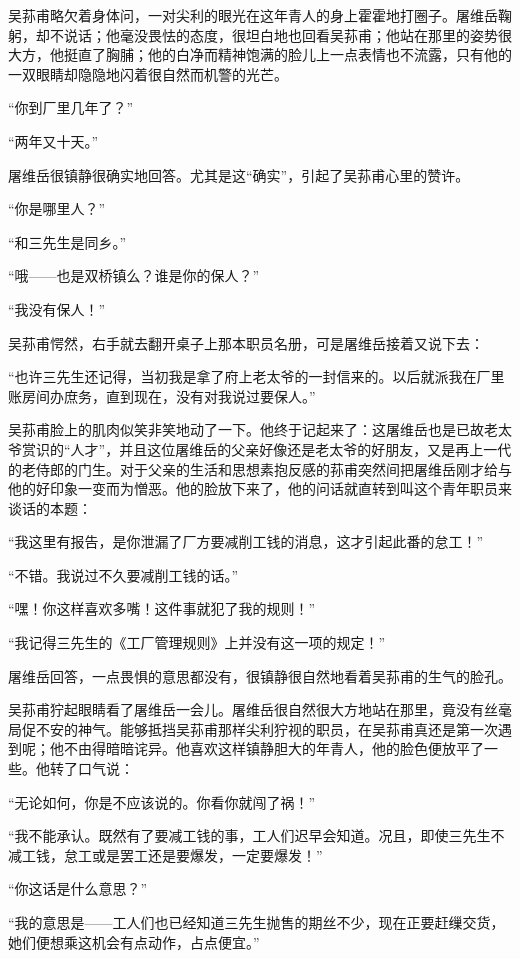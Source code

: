 \par 吴荪甫略欠着身体问，一对尖利的眼光在这年青人的身上霍霍地打圈子。屠维岳鞠躬，却不说话；他毫没畏怯的态度，很坦白地也回看吴荪甫；他站在那里的姿势很大方，他挺直了胸脯；他的白净而精神饱满的脸儿上一点表情也不流露，只有他的一双眼睛却隐隐地闪着很自然而机警的光芒。
\par “你到厂里几年了？”
\par “两年又十天。”
\par 屠维岳很镇静很确实地回答。尤其是这“确实”，引起了吴荪甫心里的赞许。
\par “你是哪里人？”
\par “和三先生是同乡。”
\par “哦——也是双桥镇么？谁是你的保人？”
\par “我没有保人！”
\par 吴荪甫愕然，右手就去翻开桌子上那本职员名册，可是屠维岳接着又说下去：
\par “也许三先生还记得，当初我是拿了府上老太爷的一封信来的。以后就派我在厂里账房间办庶务，直到现在，没有对我说过要保人。”
\par 吴荪甫脸上的肌肉似笑非笑地动了一下。他终于记起来了：这屠维岳也是已故老太爷赏识的“人才”，并且这位屠维岳的父亲好像还是老太爷的好朋友，又是再上一代的老侍郎的门生。对于父亲的生活和思想素抱反感的荪甫突然间把屠维岳刚才给与他的好印象一变而为憎恶。他的脸放下来了，他的问话就直转到叫这个青年职员来谈话的本题：
\par “我这里有报告，是你泄漏了厂方要减削工钱的消息，这才引起此番的怠工！”
\par “不错。我说过不久要减削工钱的话。”
\par “嘿！你这样喜欢多嘴！这件事就犯了我的规则！”
\par “我记得三先生的《工厂管理规则》上并没有这一项的规定！”
\par 屠维岳回答，一点畏惧的意思都没有，很镇静很自然地看着吴荪甫的生气的脸孔。
\par 吴荪甫狞起眼睛看了屠维岳一会儿。屠维岳很自然很大方地站在那里，竟没有丝毫局促不安的神气。能够抵挡吴荪甫那样尖利狞视的职员，在吴荪甫真还是第一次遇到呢；他不由得暗暗诧异。他喜欢这样镇静胆大的年青人，他的脸色便放平了一些。他转了口气说：
\par “无论如何，你是不应该说的。你看你就闯了祸！”
\par “我不能承认。既然有了要减工钱的事，工人们迟早会知道。况且，即使三先生不减工钱，怠工或是罢工还是要爆发，一定要爆发！”
\par “你这话是什么意思？”
\par “我的意思是——工人们也已经知道三先生抛售的期丝不少，现在正要赶缫交货，她们便想乘这机会有点动作，占点便宜。”
